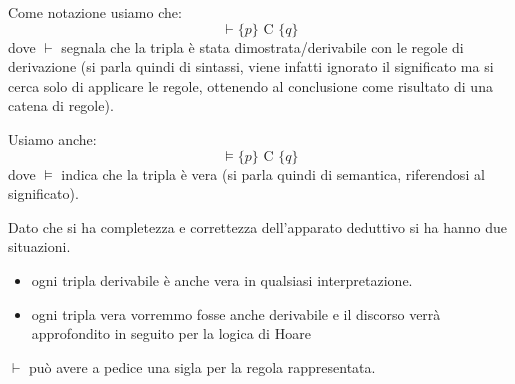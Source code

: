 Come notazione usiamo che:
\begin{equation}
    \vdash \{p\} \text{ C } \{q\}
\end{equation}
dove $\vdash$ segnala che la tripla è stata dimostrata/derivabile con le regole di derivazione (si parla quindi di sintassi, viene infatti ignorato il significato ma si cerca solo di applicare le regole, ottenendo al conclusione come risultato di
una catena di regole).

Usiamo anche:
\begin{equation}
    \models \{p\} \text{ C } \{q\}
\end{equation}
dove $\models$ indica che la tripla è vera (si parla quindi di semantica, riferendosi al significato).

Dato che si ha completezza e correttezza dell’apparato deduttivo si ha hanno due situazioni.
\begin{itemize}
    \item ogni tripla derivabile è anche vera in qualsiasi interpretazione.
    \item ogni tripla vera vorremmo fosse anche derivabile e il discorso verrà approfondito in seguito per la logica di Hoare
\end{itemize}
$\vdash$ può avere a pedice una sigla per la regola rappresentata.
